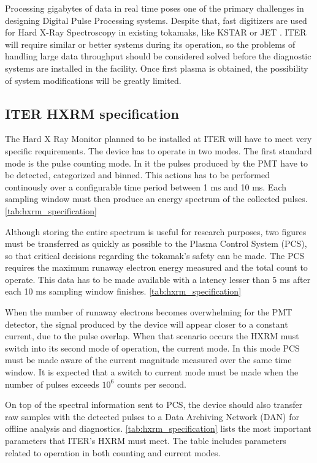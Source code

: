 Processing gigabytes of data in real time poses one of 
the primary challenges in designing Digital Pulse Processing systems.
Despite that, fast digitizers are used for Hard X-Ray Spectroscopy
in existing tokamaks, like KSTAR or JET \cite{hxrm_jet, kstar_upgrade}.
ITER will require similar or better systems during its operation,
so the problems of handling large data throughput
should be considered solved before the diagnostic systems
are installed in the facility. Once first plasma is obtained,
the possibility of system modifications will be greatly limited.
 

\subsection{ITER HXRM specification}

The Hard X Ray Monitor planned to be installed at ITER will 
have to meet very specific requirements. The device 
has to operate in two modes. The first standard mode is the pulse 
counting mode. In it the pulses produced by the PMT have to be
detected, categorized and binned. This actions has to be 
performed continously over a configurable time period between
1 ms and 10 ms. Each sampling window must then produce an 
energy spectrum of the collected pulses. 
\autoref{tab:hxrm_specification}

Although storing the entire spectrum
is useful for research purposes, two figures must be transferred 
as quickly as possible to the Plasma Control System (PCS), so that
critical decisions regarding the tokamak's safety can be made.
The PCS requires the maximum runaway electron energy measured
and the total count to operate. This data has to be made available
with a latency lesser than 5 ms after each 10 ms sampling window finishes.
\autoref{tab:hxrm_specification}

When the number of runaway electrons becomes overwhelming for
the PMT detector, the signal produced by the device will 
appear closer to a constant current, due to the pulse overlap.
When that scenario occurs the HXRM must switch into its second 
mode of operation, the current mode. In this mode PCS 
must be made aware of the current magnitude measured over the 
same time window. It is expected that a switch to current mode
must be made when the number of pulses exceeds $10^6$ counts per second.


On top of the spectral information sent to PCS,
the device should also transfer raw samples with the detected pulses
to a Data Archiving Network (DAN) for offline analysis and diagnostics.
\autoref{tab:hxrm_specification} lists the most important 
parameters that ITER's HXRM must meet. 
The table includes parameters related to operation 
in both counting and current modes.

